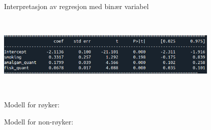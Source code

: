 \documentclass[10pt,ignorenonframetext,]{beamer}
\begin{document}
\begin{frame}

\begin{block}{Interpretasjon av regresjon med binær variabel}

\(~\)

\includegraphics[width=0.8\textwidth,height=\textheight]{binaer_variabel.png}

\(~\)

Modell for røyker:

\vspace{15mm}

Modell for non-røyker:

\end{block}

\end{frame}
\end{document}
